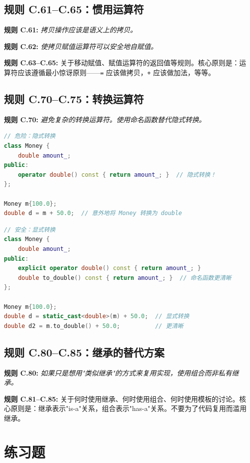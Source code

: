 \subsection{规则 C.61--C.65：惯用运算符}

\textbf{规则 C.61:} \textit{拷贝操作应该是语义上的拷贝。}

\textbf{规则 C.62:} \textit{使拷贝赋值运算符可以安全地自赋值。}

\textbf{规则 C.63--C.65:} 关于移动赋值、赋值运算符的返回值等规则。核心原则是：运算符应该遵循最小惊讶原则——\texttt{=} 应该做拷贝，\texttt{+} 应该做加法，等等。

\subsection{规则 C.70--C.75：转换运算符}

\textbf{规则 C.70:} \textit{避免复杂的转换运算符。使用命名函数替代隐式转换。}

\begin{lstlisting}[language=C++]
// 危险：隐式转换
class Money {
    double amount_;
public:
    operator double() const { return amount_; }  // 隐式转换！
};

Money m{100.0};
double d = m + 50.0;  // 意外地将 Money 转换为 double
\end{lstlisting}

\begin{lstlisting}[language=C++]
// 安全：显式转换
class Money {
    double amount_;
public:
    explicit operator double() const { return amount_; }
    double to_double() const { return amount_; }  // 命名函数更清晰
};

Money m{100.0};
double d = static_cast<double>(m) + 50.0;  // 显式转换
double d2 = m.to_double() + 50.0;          // 更清晰
\end{lstlisting}

\subsection{规则 C.80--C.85：继承的替代方案}

\textbf{规则 C.80:} \textit{如果只是想用"类似继承"的方式来复用实现，使用组合而非私有继承。}

\textbf{规则 C.81--C.85:} 关于何时使用继承、何时使用组合、何时使用模板的讨论。核心原则是：继承表示"is-a"关系，组合表示"has-a"关系。不要为了代码复用而滥用继承。

\section*{练习题}

